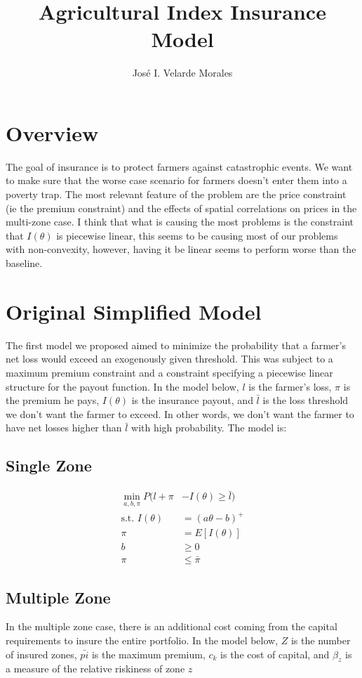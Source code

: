 \documentclass[11pt]{article}
\title{Agricultural Index Insurance Model}
\author{José I. Velarde Morales}
\begin{document}
\maketitle

\section{Overview}
The goal of insurance is to protect farmers against catastrophic events. We want to make sure that the worse case scenario for farmers doesn't enter them into a poverty trap. The most relevant feature of the problem are the price constraint (ie the premium constraint) and the effects of spatial correlations on prices in the multi-zone case. I think that what is causing the most problems is the constraint that $I(\theta)$ is piecewise linear, this seems to be causing most of our problems with non-convexity, however, having it be linear seems to perform worse than the baseline. 

\section{Original Simplified Model}

The first model we proposed aimed to minimize the probability that a farmer's net loss would exceed an exogenously given threshold. This was subject to a maximum premium constraint and a constraint specifying a piecewise linear structure for the payout function. In the model below, $l$ is the farmer's loss, $\pi$ is the premium he pays, $I(\theta)$ is the insurance payout, and $\bar{l}$ is the loss threshold we don't want the farmer to exceed. In other words, we don't want the farmer to have net losses higher than $\bar{l}$ with high probability. The model is:

\subsection*{Single Zone}

\begin{align}
    \min_{a,b,\pi} P(l + \pi &-I(\theta) \geq \bar{l})\\
    \text{s.t.   } I(\theta) &= (a\theta - b)^+\\
    \pi &= E[I(\theta)]\\
    b &\geq 0\\
    \pi &\leq \bar{\pi}
\end{align}

\subsection*{Multiple Zone}
In the multiple zone case, there is an additional cost coming from the capital requirements to insure the entire portfolio. In the model below, $Z$ is the number of insured zones, $\bar{pi}$ is the maximum premium, $c_k$ is the cost of capital, and $\beta_z$ is a measure of the relative riskiness of zone $z$
\end{document}

